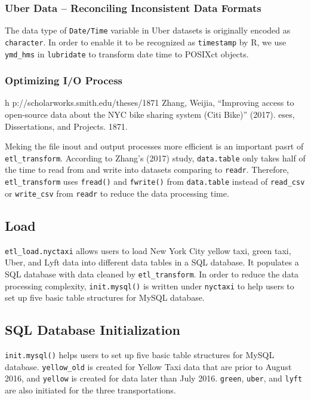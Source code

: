\documentclass[12pt,twoside]{reedthesis}
\theoremstyle{definition}
\theoremstyle{definition}
\theoremstyle{definition}
\theoremstyle{remark}
\begin{document}
\subsubsection{Uber Data -- Reconciling Inconsistent Data
Formats}\label{uber-data-reconciling-inconsistent-data-formats}

The data type of \texttt{Date/Time} variable in Uber datasets is
originally encoded as \texttt{character}. In order to enable it to be
recognized as \texttt{timestamp} by R, we use \texttt{ymd\_hms} in
\texttt{lubridate} to transform date time to POSIXct objects.

\subsubsection{Optimizing I/O Process}\label{optimizing-io-process}

h p://scholarworks.smith.edu/theses/1871 Zhang, Weijia, ``Improving
access to open-source data about the NYC bike sharing system (Citi
Bike)'' (2017). eses, Dissertations, and Projects. 1871.

Meking the file inout and output processes more efficient is an
important pasrt of \texttt{etl\_transform}. According to Zhang's (2017)
study, \texttt{data.table} only takes half of the time to read from and
write into datasets comparing to \texttt{readr}. Therefore,
\texttt{etl\_transform} uses \texttt{fread()} and \texttt{fwrite()} from
\texttt{data.table} instead of \texttt{read\_csv} or \texttt{write\_csv}
from \texttt{readr} to reduce the data processing time.

\subsection{Load}\label{load}

\texttt{etl\_load.nyctaxi} allows users to load New York City yellow
taxi, green taxi, Uber, and Lyft data into different data tables in a
SQL database. It populates a SQL database with data cleaned by
\texttt{etl\_transform}. In order to reduce the data processing
complexity, \texttt{init.mysql()} is written under \texttt{nyctaxi} to
help users to set up five basic table structures for MySQL database.

\subsection{SQL Database
Initialization}\label{sql-database-initialization}

\texttt{init.mysql()} helps users to set up five basic table structures
for MySQL database. \texttt{yellow\_old} is created for Yellow Taxi data
that are prior to August 2016, and \texttt{yellow} is created for data
later than July 2016. \texttt{green}, \texttt{uber}, and \texttt{lyft}
are also initiated for the three transportations.
\end{document}
